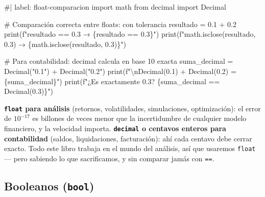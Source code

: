 \documentclass[
  spanish,
  letterpaper,
  DIV=11,
  numbers=noendperiod]{scrreprt}
\newenvironment{Shaded}{\begin{snugshade}}{\end{snugshade}}
\newcommand{\NormalTok}[1]{\textcolor[rgb]{0.00,0.23,0.31}{#1}}
\begin{document}
\begin{Shaded}
\begin{Highlighting}[]
\NormalTok{\#| label: float{-}comparacion}
\NormalTok{import math}
\NormalTok{from decimal import Decimal}

\NormalTok{\# Comparación correcta entre floats: con tolerancia}
\NormalTok{resultado = 0.1 + 0.2}
\NormalTok{print(f"resultado == 0.3          → \{resultado == 0.3\}")}
\NormalTok{print(f"math.isclose(resultado, 0.3) → \{math.isclose(resultado, 0.3)\}")}

\NormalTok{\# Para contabilidad: decimal calcula en base 10 exacta}
\NormalTok{suma\_decimal = Decimal("0.1") + Decimal("0.2")}
\NormalTok{print(f"\textbackslash{}nDecimal(\textquotesingle{}0.1\textquotesingle{}) + Decimal(\textquotesingle{}0.2\textquotesingle{}) = \{suma\_decimal\}")}
\NormalTok{print(f"¿Es exactamente 0.3? \{suma\_decimal == Decimal(\textquotesingle{}0.3\textquotesingle{})\}")}
\end{Highlighting}
\end{Shaded}

\begin{tcolorbox}[enhanced jigsaw, bottomrule=.15mm, colback=white, opacitybacktitle=0.6, arc=.35mm, toprule=.15mm, opacityback=0, breakable, titlerule=0mm, left=2mm, coltitle=black, colbacktitle=quarto-callout-warning-color!10!white, colframe=quarto-callout-warning-color-frame, leftrule=.75mm, toptitle=1mm, bottomtitle=1mm, title=\textcolor{quarto-callout-warning-color}{\faExclamationTriangle}\hspace{0.5em}{La regla práctica: ¿float o decimal?}, rightrule=.15mm]

\textbf{\texttt{float} para análisis} (retornos, volatilidades,
simulaciones, optimización): el error de \(10^{-17}\) es billones de
veces menor que la incertidumbre de cualquier modelo financiero, y la
velocidad importa. \textbf{\texttt{decimal} o centavos enteros para
contabilidad} (saldos, liquidaciones, facturación): ahí cada centavo
debe cerrar exacto. Todo este libro trabaja en el mundo del análisis,
así que usaremos \texttt{float} --- pero sabiendo lo que sacrificamos, y
sin comparar jamás con \texttt{==}.

\end{tcolorbox}

\subsection{\texorpdfstring{Booleanos
(\texttt{bool})}{Booleanos (bool)}}\label{booleanos-bool}
\end{document}
